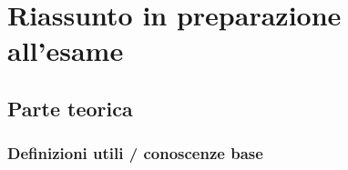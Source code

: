
\chapter{Riassunto in preparazione all'esame}

\section{Parte teorica}

\subsection{Definizioni utili / conoscenze base}


